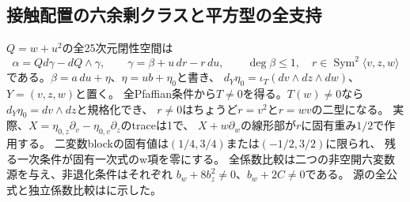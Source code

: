 \documentclass[a4paper,11pt]{ltjsarticle}
\theoremstyle{definition}
\begin{document}
\subsection{接触配置の六余剰クラスと平方型の全支持}
$Q=w+u^2$の全25次元閉性空間は
\[
 \alpha=Qd\gamma-dQ\wedge\gamma,\qquad
 \gamma=\beta+u\,dr-r\,du,\qquad
 \deg\beta\le1,\quad r\in\operatorname{Sym}^2\langle v,z,w\rangle
\]
である。$\beta=a\,du+\eta$、$\eta=u b+\eta_0$と書き、
$d_Y\eta_0=\iota_T(dv\wedge dz\wedge dw)$、$Y=(v,z,w)$と置く。
全Pfaffian条件から$T\ne0$を得る。$T(w)\ne0$なら$d_Y\eta_0=dv\wedge dz$と規格化でき、
$r\ne0$はちょうど$r=v^2$と$r=wv$の二型になる。
実際、$X=\eta_{0,z}\partial_v-\eta_{0,v}\partial_z$のtraceは1で、
$X+w\partial_w$の線形部が$r$に固有重み$1/2$で作用する。
二変数blockの固有値は$(1/4,3/4)$または$(-1/2,3/2)$に限られ、
残る一次条件が固有一次式のw項を零にする。
全係数比較は二つの非空開六変数源を与え、非退化条件はそれぞれ
$b_w+8b_z^2\ne0$、$b_w+2C\ne0$である。
源の全公式と独立係数比較はに示した。
\end{document}
